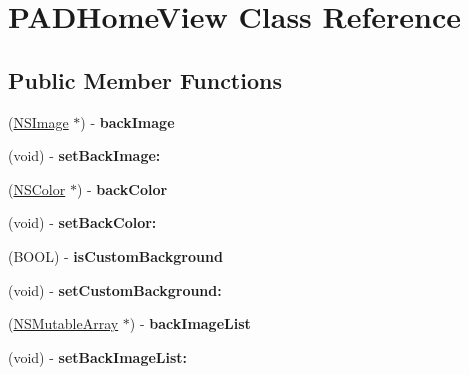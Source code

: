 \hypertarget{interface_p_a_d_home_view}{
\section{PADHomeView Class Reference}
\label{interface_p_a_d_home_view}
}
\subsection*{Public Member Functions}
\begin{DoxyCompactItemize}
\item 
\hypertarget{interface_p_a_d_home_view_a3207254f5d28dd5353d29dbd3e357741}{
(\hyperlink{class_n_s_image}{NSImage} $\ast$) -\/ {\bfseries backImage}}
\label{interface_p_a_d_home_view_a3207254f5d28dd5353d29dbd3e357741}

\item 
\hypertarget{interface_p_a_d_home_view_a25705e85977b29c7f372f878fa3c5241}{
(void) -\/ {\bfseries setBackImage:}}
\label{interface_p_a_d_home_view_a25705e85977b29c7f372f878fa3c5241}

\item 
\hypertarget{interface_p_a_d_home_view_ace46f97b72401247a63e6db1c0282fff}{
(\hyperlink{class_n_s_color}{NSColor} $\ast$) -\/ {\bfseries backColor}}
\label{interface_p_a_d_home_view_ace46f97b72401247a63e6db1c0282fff}

\item 
\hypertarget{interface_p_a_d_home_view_a02b14a40a86c22dd72567b96a841ec4d}{
(void) -\/ {\bfseries setBackColor:}}
\label{interface_p_a_d_home_view_a02b14a40a86c22dd72567b96a841ec4d}

\item 
\hypertarget{interface_p_a_d_home_view_a96dfa38f286364a6e1bf812cbda38679}{
(BOOL) -\/ {\bfseries isCustomBackground}}
\label{interface_p_a_d_home_view_a96dfa38f286364a6e1bf812cbda38679}

\item 
\hypertarget{interface_p_a_d_home_view_a83db22687348e2c0a4adad183f1f13dd}{
(void) -\/ {\bfseries setCustomBackground:}}
\label{interface_p_a_d_home_view_a83db22687348e2c0a4adad183f1f13dd}

\item 
\hypertarget{interface_p_a_d_home_view_a787c2fd0d3e5ffefdea0d6f882c6dc67}{
(\hyperlink{class_n_s_mutable_array}{NSMutableArray} $\ast$) -\/ {\bfseries backImageList}}
\label{interface_p_a_d_home_view_a787c2fd0d3e5ffefdea0d6f882c6dc67}

\item 
\hypertarget{interface_p_a_d_home_view_acc435f580d8bd94676651914c8a584ea}{
(void) -\/ {\bfseries setBackImageList:}}
\label{interface_p_a_d_home_view_acc435f580d8bd94676651914c8a584ea}


\end{DoxyCompactItemize}

